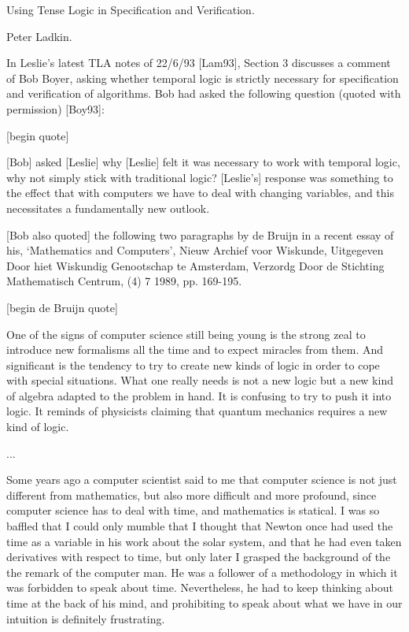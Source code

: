 \begin{spec}

Using Tense Logic in Specification and Verification.

Peter Ladkin.

In Leslie's latest TLA notes of 22/6/93 [Lam93], Section 3 discusses
a comment of Bob Boyer, asking whether temporal logic is strictly
necessary for specification and verification of algorithms. Bob had
asked the following question (quoted with permission) [Boy93]:

[begin quote]

  [Bob] asked [Leslie] why [Leslie] felt it was necessary to work
  with temporal logic, why not simply stick with traditional logic?
  [Leslie's] response was something to the effect that with
  computers we have to deal with changing variables, and this
  necessitates a fundamentally new outlook.

  [Bob also quoted] the following two paragraphs by de Bruijn in a
  recent essay of his, `Mathematics and Computers', Nieuw Archief
  voor Wiskunde, Uitgegeven Door hiet Wiskundig Genootschap te
  Amsterdam, Verzordg Door de Stichting Mathematisch Centrum, (4) 7
  1989, pp.  169-195.

[begin de Bruijn quote]

  One of the signs of computer science still being young is the
  strong zeal to introduce new formalisms all the time and to expect
  miracles from them.  And significant is the tendency to try to
  create new kinds of logic in order to cope with special
  situations.  What one really needs is not a new logic but a new
  kind of algebra adapted to the problem in hand.  It is confusing
  to try to push it into logic.  It reminds of physicists claiming
  that quantum mechanics requires a new kind of logic.

  ...

  Some years ago a computer scientist said to me that computer
  science is not just different from mathematics, but also more
  difficult and more profound, since computer science has to deal
  with time, and mathematics is statical.  I was so baffled that I
  could only mumble that I thought that Newton once had used the
  time as a variable in his work about the solar system, and that he
  had even taken derivatives with respect to time, but only later I
  grasped the background of the the remark of the computer man.  He
  was a follower of a methodology in which it was forbidden to speak
  about time.  Nevertheless, he had to keep thinking about time at
  the back of his mind, and prohibiting to speak about what we have
  in our intuition is definitely frustrating.


\end{spec}
